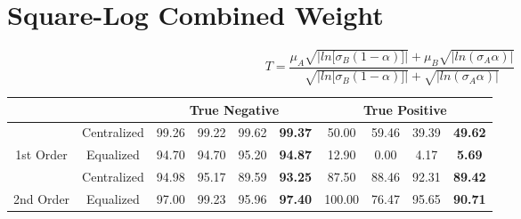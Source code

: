 \documentclass[10pt,a4paper]{article}
\begin{document}
	\section{Square-Log Combined Weight}
		$$
		T = \frac{\mu_A \sqrt{|ln\big[\sigma_B (1 - \alpha)\big]|}
			+ \mu_B \sqrt{|ln(\sigma_A \alpha)|}}
		{\sqrt{|ln\big[\sigma_B (1 - \alpha)\big]|} + \sqrt{|ln(\sigma_A \alpha)|}}
		$$
		\begin{table}[!h]
			\centering
			\begin{tabular}{|c|c|c|c|c|c|c|c|c|c|}
				\hline
				&             & \multicolumn{4}{c|}{True Negative}                            & \multicolumn{4}{c|}{True Positive}                             \\ \hline
				& Centralized & 99.26 & 99.22 & 99.62 & {\color[HTML]{FE0000} \textbf{99.37}} & 50.00  & 59.46 & 39.39 & {\color[HTML]{FE0000} \textbf{49.62}} \\ \cline{2-10} 
				\multirow{-2}{*}{1st Order} & Equalized   & 94.70 & 94.70 & 95.20 & {\color[HTML]{FE0000} \textbf{94.87}} & 12.90  & 0.00  & 4.17  & {\color[HTML]{FE0000} \textbf{5.69}}  \\ \hline
				& Centralized & 94.98 & 95.17 & 89.59 & {\color[HTML]{FE0000} \textbf{93.25}} & 87.50  & 88.46 & 92.31 & {\color[HTML]{FE0000} \textbf{89.42}} \\ \cline{2-10} 
				\multirow{-2}{*}{2nd Order} & Equalized   & 97.00 & 99.23 & 95.96 & {\color[HTML]{FE0000} \textbf{97.40}} & 100.00 & 76.47 & 95.65 & {\color[HTML]{FE0000} \textbf{90.71}} \\ \hline
			\end{tabular}
		\end{table}
	
\end{document}
